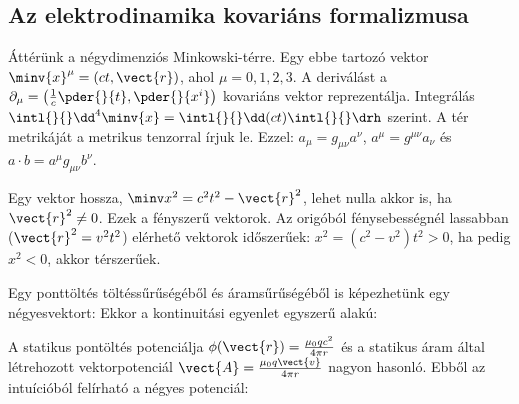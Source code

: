   \subsection{Az elektrodinamika kovariáns formalizmusa}
   
   Áttérünk a négydimenziós Minkowski-térre.
   Egy ebbe tartozó vektor $\minv{x}^\mu=(ct,\vect{r})$, ahol $\mu=0,1,2,3$.
   A deriválást a $\partial_\mu=\left(\frac{1}{c}\pder{}{t}, \pder{}{x^i}\right)$ kovariáns vektor reprezentálja.
   Integrálás $\intl{}{}\dd^4\minv{x}=\intl{}{}\dd(ct)\intl{}{}\drh$ szerint.
   A tér metrikáját a 
   metrikus tenzorral írjuk le.
   Ezzel: $a_\mu=g_{\mu\nu}a^\nu$, $a^\mu=g^{\mu\nu}a_\nu$ és $a\cdot b=a^\mu g_{\mu\nu}b^\nu$. 
   
   Egy vektor hossza, $\minv x^2=c^2t^2-\vect{r}^2$, lehet nulla akkor is, ha $\vect{r}^2\neq 0$.
   Ezek a fényszerű vektorok.
   Az origóból fénysebességnél lassabban ($\vect{r}^2=v^2t^2$) elérhető vektorok időszerűek: $x^2=(c^2-v^2)t^2>0$, ha pedig $x^2<0$, akkor térszerűek. 
   
   Egy ponttöltés töltéssűrűségéből és áramsűrűségéből is képezhetünk egy négyesvektort:
   Ekkor a kontinuitási egyenlet egyszerű alakú:
   
   A statikus pontöltés potenciálja $\phi(\vect{r})=\frac{\mu_0qc^2}{4\pi r}$ és a statikus áram által létrehozott vektorpotenciál $\vect{A}=\frac{\mu_0q\vect{v}}{4\pi r}$ nagyon hasonló.
   Ebből az intuícióból felírható a négyes potenciál:
   
